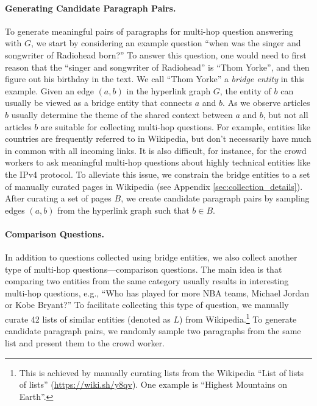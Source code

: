 \paragraph{Generating Candidate Paragraph Pairs.}
To generate meaningful pairs of paragraphs for multi-hop question answering with $G$, we start by considering an example question ``when was the singer and songwriter of Radiohead born?''
To answer this question, one would need to first reason that the ``singer and songwriter of Radiohead'' is ``Thom Yorke'', and then figure out his birthday in the text.
We call ``Thom Yorke'' a \emph{bridge entity} in this example.
Given an edge $(a, b)$ in the hyperlink graph $G$, the entity of $b$ can usually be viewed as a bridge entity that connects $a$ and $b$.
As we observe articles $b$ usually determine the theme of the shared context between $a$ and $b$, but not all articles $b$ are suitable for collecting multi-hop questions.
For example, entities like countries are frequently referred to in Wikipedia, but don't necessarily have much in common with all incoming links.
It is also difficult, for instance, for the crowd workers to ask meaningful multi-hop questions about highly technical entities like the IPv4 protocol.
To alleviate this issue, we constrain the bridge entities to a set of manually curated pages in Wikipedia (see Appendix \ref{sec:collection_details}).
After curating a set of pages $B$, we create candidate paragraph pairs by sampling edges $(a, b)$ from the hyperlink graph such that $b \in B$.

\paragraph{Comparison Questions.}
In addition to questions collected using bridge entities, we also collect another type of multi-hop questions---comparison questions.
The main idea is that comparing two entities from the same category usually results in interesting multi-hop questions, e.g., ``Who has played for more NBA teams, Michael Jordan or Kobe Bryant?''
To facilitate collecting this type of question, we manually curate 42 lists of similar entities (denoted as $L$) from Wikipedia.\footnote{This is achieved by manually curating lists from the Wikipedia ``List of lists of lists'' (\url{https://wiki.sh/y8qv}). One example is ``Highest Mountains on Earth''.}
To generate candidate paragraph pairs, we randomly sample two paragraphs from the same list and present them to the crowd worker.

